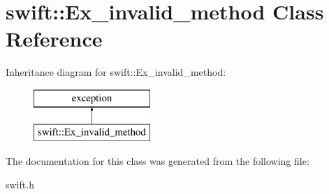 \hypertarget{classswift_1_1_ex__invalid__method}{\section{swift\-:\-:Ex\-\_\-invalid\-\_\-method Class Reference}
\label{classswift_1_1_ex__invalid__method}
}
Inheritance diagram for swift\-:\-:Ex\-\_\-invalid\-\_\-method\-:\begin{figure}[H]
\begin{center}
\leavevmode
\includegraphics[height=2.000000cm]{classswift_1_1_ex__invalid__method}
\end{center}
\end{figure}


The documentation for this class was generated from the following file\-:\begin{DoxyCompactItemize}
\item 
swift.\-h\end{DoxyCompactItemize}
